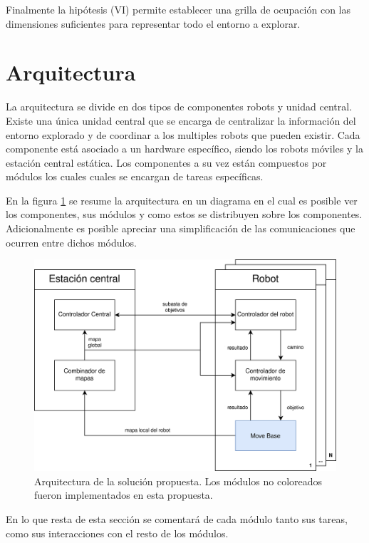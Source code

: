 Finalmente la hipótesis (VI) permite establecer una grilla de ocupación con las
dimensiones suficientes para representar todo el entorno a explorar. 

\section{Arquitectura}\label{sec:arqui}
La arquitectura se divide en dos tipos de componentes robots y unidad central.
Existe una única unidad central que se encarga de centralizar la información
del entorno explorado y de coordinar a los multiples robots que pueden existir.
Cada componente está asociado a un hardware específico, siendo los robots móviles
y la estación central estática. 
Los componentes a su vez están compuestos por módulos los cuales cuales se encargan
de tareas específicas. 

En la figura \ref{fig:arquitectura} se resume la arquitectura en un diagrama en
el cual es posible ver los componentes, sus módulos y como estos se distribuyen
sobre los componentes. Adicionalmente es posible apreciar una simplificación de las
comunicaciones que ocurren entre dichos módulos.


\begin{figure}[H]
  \center
  \includegraphics[width=1\linewidth]{imagenes/arquitectura.png}
  \caption[Arquitectura de la solucion propuesta.]{Arquitectura de la solución propuesta. Los módulos no coloreados fueron implementados en esta propuesta.}
  \label{fig:arquitectura}
\end{figure} 

En lo que resta de esta sección se comentará de cada módulo tanto sus tareas,
como sus interacciones con el resto de los módulos.

